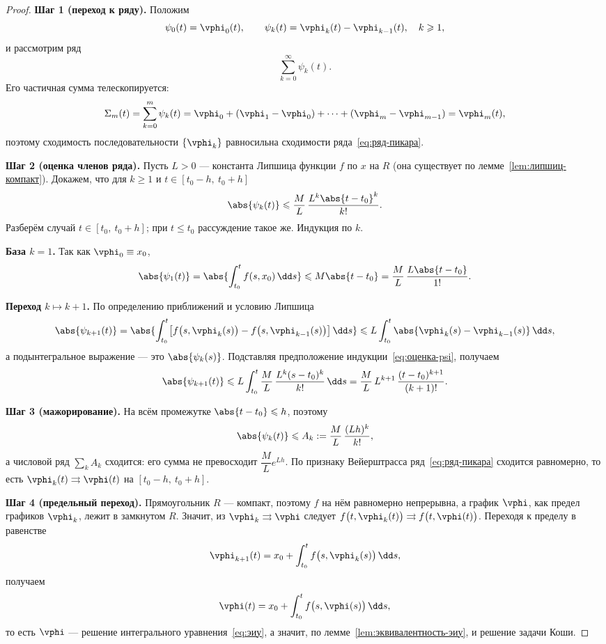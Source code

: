 \begin{proof}
	\textbf{Шаг 1 (переход к ряду).} Положим
	\[
	\psi_0(t) = \vphi_0(t), \qquad
	\psi_k(t) = \vphi_k(t) - \vphi_{k-1}(t), \quad k \geqslant 1,
	\]
	и рассмотрим ряд
	\begin{equation}\label{eq:ряд-пикара}
		\sum_{k=0}^{\infty} \psi_k(t).
	\end{equation}
	Его частичная сумма телескопируется:
	\[
	\Sigma_m(t) = \sum_{k=0}^{m} \psi_k(t)
	= \vphi_0 + (\vphi_1 - \vphi_0) + \dots + (\vphi_m - \vphi_{m-1})
	= \vphi_m(t),
	\]
	поэтому сходимость последовательности $\{\vphi_k\}$ равносильна сходимости
	ряда~\eqref{eq:ряд-пикара}.

	\medskip
	\textbf{Шаг 2 (оценка членов ряда).} Пусть $L > 0$ --- константа Липшица
	функции $f$ по $x$ на $R$ (она существует по
	лемме~\ref{lem:липшиц-компакт}). Докажем, что для $k \geqslant 1$ и $t \in [t_0-h,\ t_0+h]$
	\begin{equation}\label{eq:оценка-psi}
		\abs{\psi_k(t)} \leqslant \frac{M}{L}\,\frac{L^k\abs{t-t_0}^k}{k!} .
	\end{equation}
	Разберём случай $t \in [t_0,\ t_0+h]$; при $t \leqslant t_0$ рассуждение
	такое же. Индукция по $k$.

	\medskip
	\textbf{База $k = 1$.} Так как $\vphi_0 \equiv x_0$,
	\[
	\abs{\psi_1(t)} = \abs{\int_{t_0}^{t} f(s, x_0)\,\dd s}
	\leqslant M\abs{t - t_0} = \frac{M}{L}\,\frac{L\abs{t-t_0}}{1!} .
	\]

	\medskip
	\textbf{Переход $k \mapsto k+1$.} По определению приближений и условию
	Липшица
	\[
	\abs{\psi_{k+1}(t)}
	= \abs{\int_{t_0}^{t} \bigl[f\bigl(s, \vphi_k(s)\bigr)
	- f\bigl(s, \vphi_{k-1}(s)\bigr)\bigr]\,\dd s}
	\leqslant L\int_{t_0}^{t} \abs{\vphi_k(s) - \vphi_{k-1}(s)}\,\dd s ,
	\]
	а подынтегральное выражение --- это $\abs{\psi_k(s)}$. Подставляя
	предположение индукции~\eqref{eq:оценка-psi}, получаем
	\[
	\abs{\psi_{k+1}(t)}
	\leqslant L\int_{t_0}^{t} \frac{M}{L}\,\frac{L^k(s-t_0)^k}{k!}\,\dd s
	= \frac{M}{L}\,L^{k+1}\,\frac{(t-t_0)^{k+1}}{(k+1)!} .
	\]

	\medskip
	\textbf{Шаг 3 (мажорирование).} На всём промежутке
	$\abs{t - t_0} \leqslant h$, поэтому
	\[
	\abs{\psi_k(t)} \leqslant A_k := \frac{M}{L}\,\frac{(Lh)^k}{k!} ,
	\]
	а числовой ряд $\sum_k A_k$ сходится: его сумма не превосходит
	$\dfrac{M}{L}e^{Lh}$. По признаку Вейерштрасса
	ряд~\eqref{eq:ряд-пикара} сходится равномерно, то есть
	$\vphi_k(t) \rightrightarrows \vphi(t)$ на $[t_0-h,\ t_0+h]$.

	\medskip
	\textbf{Шаг 4 (предельный переход).} Прямоугольник $R$ --- компакт,
	поэтому $f$ на нём равномерно непрерывна, а график $\vphi$, как предел
	графиков $\vphi_k$, лежит в замкнутом $R$. Значит, из
	$\vphi_k \rightrightarrows \vphi$ следует
	$f\bigl(t, \vphi_k(t)\bigr) \rightrightarrows f\bigl(t, \vphi(t)\bigr)$.
	Переходя к пределу в равенстве
	\[
	\vphi_{k+1}(t) = x_0 + \int_{t_0}^{t} f\bigl(s, \vphi_k(s)\bigr)\,\dd s ,
	\]
	получаем
	\[
	\vphi(t) = x_0 + \int_{t_0}^{t} f\bigl(s, \vphi(s)\bigr)\,\dd s ,
	\]
	то есть $\vphi$ --- решение интегрального уравнения~\eqref{eq:эиу}, а значит,
	по лемме~\ref{lem:эквивалентность-эиу}, и решение задачи Коши.
\end{proof}

